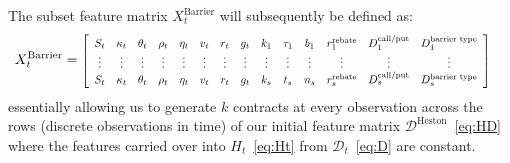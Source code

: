 \documentclass[11pt]{article}
\newcommand{\D}{\mathcal{D}}
\begin{document}
			The subset feature matrix $X^{\text{Barrier}}_{t}$ will subsequently be defined as:
			\begin{align}
				X^{\text{Barrier}}_{t} &= 
				\scalebox{0.8}{$
					\left[
					\begin{array}{cccccccccccccc}
						S_{t} & \kappa_{t} & \theta_{t} & \rho_{t} & \eta_{t} & v_{t} & r_{t} & g_{t} & k_{1} &\tau_{1} & b_{1} & r^{\text{rebate}}_{1} & D^{\text{call/put}}_{1} & D^{\text{barrier type}}_{1} \\
						\vdots & \vdots & \vdots & \vdots & \vdots & \vdots & \vdots & \vdots & \vdots & \vdots & \vdots & \vdots & \vdots & \vdots \\
						S_{t} & \kappa_{t} & \theta_{t} & \rho_{t} & \eta_{t} & v_{t} & r_{t} & g_{t} & k_{s} & t_{s} & n_{s} & r^{\text{rebate}}_{s} & D^{\text{call/put}}_{s} & D^{\text{barrier type}}_{s} \\
					\end{array}
					\right]$} \label{eq:BXt}
			\end{align}
			essentially allowing us to generate $k$ contracts at every observation across the rows (discrete observations in time) of our initial feature matrix $\D^{\text{Heston}}$~\eqref{eq:HD} where the features carried over into $H_{t}$~\eqref{eq:Ht} from $\D_{t}$~\eqref{eq:D} are constant.
		
\end{document}
